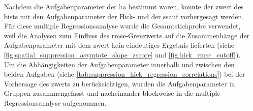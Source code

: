 \documentclass[11pt, twoside, a4paper]{book}		%
\begin{document}
Nachdem die Aufgabenparameter der \gls{ha} bestimmt waren, konnte der \gls{zwert} des \gls{bist}s mit den Aufgabenparameter der Hick- und der \gls{ssauf} vorhergesagt werden. Für diese multiple Regressionsanalyse wurde die Gesamtstichprobe verwendet, weil die Analysen zum Einfluss des \gls{rmse}-Grenzwerts auf die Zusammenhänge der Aufgabenparameter mit dem \gls{zwert} kein eindeutiges Ergebnis lieferten (siehe \autoref{fig:spatial_suppression_asymtote_slope_zscore} und \autoref{fig:hick_rmse_cutoff}). Um die Abhängigkeiten der Aufgabenparameter innerhalb und zwischen den beiden Aufgaben (siehe \autoref{tab:suppression_hick_regression_correlations}) bei der Vorhersage des \gls{zwert}s zu berücksichtigen, wurden die Aufgabenparameter in Gruppen zusammengefasst und nacheinander blockweise in die multiple Regressionsanalyse aufgenommen. 
\end{document}
